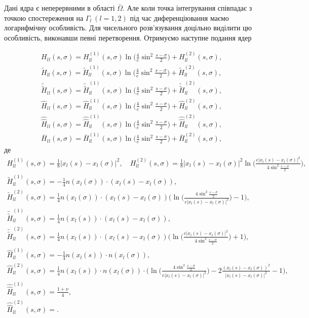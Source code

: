 \documentclass[12pt]{report}
\begin{document}
  Дані ядра є неперервними в області $\bar{\Omega}$. Але коли точка інтегрування співпадає з точкою спостереження на $\Gamma_l \ (l=1,2)$ під час диференціювання маємо логарифмічну особливість. Для чисельного розв'язування доцільно виділити цю особливість, виконавши певні перетворення. Отримуємо наступне подання ядер 
  
 \begin{gather}
 	H_l{_l}(s, \sigma)=H^{(1)}_{ll}(s, \sigma)\ln\bigg(\frac{4}{e}\sin^2\frac{s-\sigma}{2}\bigg)+H^{(2)}_{ll}(s, \sigma), \\
	\tilde{H}_{ll}(s, \sigma)=\tilde{H}^{(1)}_{ll}(s, \sigma)\ln\bigg(\frac{4}{e}\sin^2\frac{s-\sigma}{2}\bigg)+\tilde{H}^{(2)}_{ll}(s, \sigma), \\
	\tilde{\tilde{H}}_l{_l}(s, \sigma)=\tilde{\tilde{H}}^{(1)}_{ll}(s, \sigma)\ln\bigg(\frac{4}{e}\sin^2\frac{s-\sigma}{2}\bigg)+\tilde{\tilde{H}}^{(2)}_{ll}(s, \sigma), \\
	\hat{H}_l{_l}(s, \sigma)=\hat{H}^{(1)}_{ll}(s, \sigma)\ln\bigg(\frac{4}{e}\sin^2\frac{s-\sigma}{2}\bigg)+\hat{H}^{(2)}_{ll}(s, \sigma), \\ 
	\hat{\hat{H}}_l{_l}(s, \sigma)=\hat{\hat{H}}^{(1)}_{ll}(s, \sigma)\ln\bigg(\frac{4}{e}\sin^2\frac{s-\sigma}{2}\bigg)+\hat{\hat{H}}^{(2)}_{ll}(s, \sigma), \\
	\bar{H}_l{_l}(s, \sigma)=\bar{H}^{(1)}_{ll}(s, \sigma)\ln\bigg(\frac{4}{e}\sin^2\frac{s-\sigma}{2}\bigg)+\bar{H}^{(2)}_{ll}(s, \sigma),
 \end{gather}
 де 
\begin{gather*}
	H^{(1)}_{ll}(s, \sigma)=\frac{1}{8}|x_l(s)-x_l(\sigma)|^2, \quad H^{(2)}_{ll}(s, \sigma)=\frac{1}{8}|x_l(s)-x_l(\sigma)|^2\ln\Big(\frac{e|x_l(s)-x_l(\sigma)|^2}{4\sin^2\frac{s-\sigma}{2}}\Big), \\
	\tilde{H}^{(1)}_{ll}(s, \sigma)=-\frac{1}{4}n(x_l(\sigma))\cdot(x_l(s)-x_l(\sigma)), \\
	 \tilde{H}^{(2)}_{ll}(s, \sigma)= \frac{1}{4}n(x_l(\sigma))\cdot(x_l(s)-x_l(\sigma))\bigg(\ln\Big(\frac{4\sin^2\frac{s-\sigma}{2}}{e|x_l(s)-x_l(\sigma)|^2}\Big)-1\bigg),\\
	\tilde{\tilde{H}}^{(1)}_{ll}(s, \sigma)=\frac{1}{4}n(x_l(s))\cdot(x_l(s)-x_l(\sigma)), \\
	 \tilde{\tilde{H}}^{(2)}_{ll}(s, \sigma)= \frac{1}{4}n(x_l(s))\cdot(x_l(s)-x_l(\sigma))\bigg(\ln\Big(\frac{e|x_l(s)-x_l(\sigma)|^2}{4\sin^2\frac{s-\sigma}{2}}\Big)+1\bigg),\\
	\hat{H}^{(1)}_{ll}(s, \sigma)= -\frac{1}{4}n(x_l(s))\cdot n(x_l(\sigma)), \\
	 \hat{H}^{(2)}_{ll}(s, \sigma)=\frac{1}{4}n(x_l(s))\cdot n(x_l(\sigma))\cdot\bigg(\ln\Big(\frac{4\sin^2\frac{s-\sigma}{2}}{e|x_l(s)-x_l(\sigma)|^2}\Big)-2\frac{(x_l(s)-x_l(\sigma))^2}{|x_l(s)-x_l(\sigma)|^2} -1\bigg), \\
	 \hat{\hat{H}}^{(1)}_{ll}(s, \sigma)= \frac{1+\nu}{4}, \\
	 \hat{\hat{H}}^{(2)}_{ll}(s, \sigma) = .\\ %
 \end{gather*}
 
\end{document}
